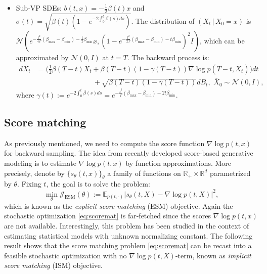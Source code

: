 \documentclass[letterpaper,11pt,reqno]{amsart}
\numberwithin{equation}{section}
\begin{document}
\begin{itemize}[itemsep = 3 pt]
\begin{equation}
\begin{aligned}
\end{aligned}
\end{equation}
\item
Sub-VP SDEs: 
$b(t,x) = -\frac{1}{2} \beta(t)x$ and $\sigma(t) = \sqrt{\beta(t) (1 - e^{-2 \int_0^t \beta(s) ds})}$.
The distribution of $(X_t \,|\, X_0 = x)$ is
$\mathcal{N}( e^{-\frac{t^2}{4T}(\beta_{\max} - \beta_{\min}) - \frac{t}{2} \beta_{\min}}  x,  
(1 -e^{-\frac{t^2}{2T}(\beta_{\max} - \beta_{\min}) - t \beta_{\min}} )^2 I )$,
which can be approximated by $\mathcal{N}(0,I)$ at $t = T$.
The backward process is:
\begin{equation}
\label{eq:SVPrev2}
\begin{aligned}
d\overline{X}_t & = \bigg( \frac{1}{2} \beta(T-t) \overline{X}_t  + \beta(T-t)(1 - \gamma(T-t)) \nabla \log p(T-t, \overline{X}_t)\bigg)  dt \\
& \qquad \qquad \qquad \qquad + \sqrt{\beta(T-t) (1 - \gamma(T-t))} dB_t,  \,\, \overline{X}_0 \sim \mathcal{N}(0, I),
\end{aligned}
\end{equation}
where $\gamma(t):= e^{-2 \int_0^t \beta(s) ds} = e^{-\frac{t^2}{T}(\beta_{\max} - \beta_{\min}) - 2t \beta_{\min}}$.
\end{itemize}

\subsection{Score matching}
\label{sc22}

As previously mentioned, 
we need to compute the score function $\nabla \log p(t,x)$
for backward sampling. 
The idea from recently developed score-based generative modeling \cite{Ho20, Song19, Song20}
is to estimate $\nabla \log p(t,x)$ by function approximations. 
More precisely, 
denote by $\{s_\theta(t,x)\}_\theta$ a family of functions on $\mathbb{R}_+ \times \mathbb{R}^d$
parametrized by $\theta$.
Fixing $t$, the goal is to solve the problem:
\begin{equation}
\label{eq:scoremat}
\min_\theta \mathcal{J}_{\text{ESM}}(\theta):=\mathbb{E}_{p(t, \cdot)} |s_\theta(t,X) - \nabla \log p(t,X)|^2,
\end{equation}
which is known as the {\em explicit score matching} (ESM) objective. 
Again the stochastic optimization \eqref{eq:scoremat} is far-fetched
since the scores $\nabla \log p(t,x)$ are not available.  
Interestingly, this problem has been studied in the context of estimating statistical models with unknown normalizing constant.
The following result \cite{Hyv05} shows that the score matching problem \eqref{eq:scoremat}
can be recast into a feasible stochastic optimization with no $\nabla \log p(t, X)$-term,
known as {\em implicit score matching} (ISM) objective.
\end{document}
